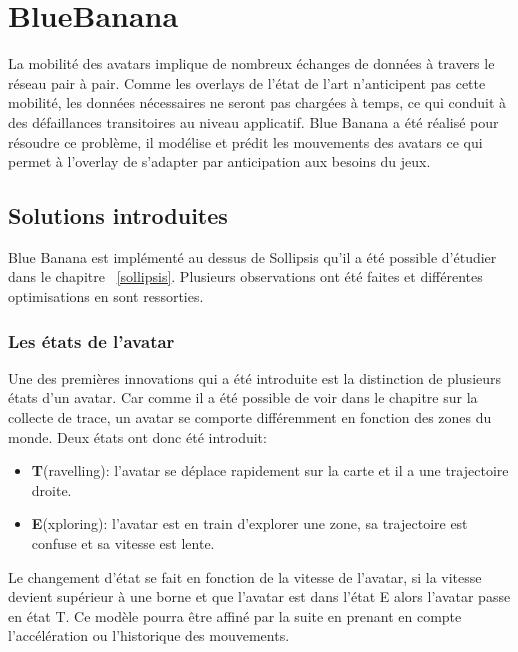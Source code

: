 \section{BlueBanana}
	\label{BlueBanana}
	La mobilité des avatars implique de nombreux échanges de données à travers le réseau pair à pair. Comme les overlays de l'état de l'art n'anticipent pas cette mobilité, les données nécessaires ne seront pas chargées à temps, ce qui conduit à des défaillances transitoires au niveau applicatif. Blue Banana a été réalisé pour résoudre ce problème, il modélise et prédit les mouvements des avatars ce qui permet à l'overlay de s'adapter par anticipation aux besoins du jeux.
	\subsection{Solutions introduites}
	Blue Banana est implémenté au dessus de Sollipsis qu'il a été possible d'étudier dans le chapitre ~\ref{sollipsis}. Plusieurs observations ont été faites et différentes optimisations en sont ressorties.
	\subsubsection{Les états de l'avatar}
	Une des premières innovations qui a été introduite est la distinction de plusieurs états d'un avatar. Car comme il a été possible de voir dans le chapitre sur la collecte de trace, un avatar se comporte différemment en fonction des zones du monde. Deux états ont donc été introduit:
	\begin{itemize}
	\renewcommand{\labelitemi}{$\bullet$}
		\item \textbf{T}(ravelling): l'avatar se déplace rapidement sur la carte et il a une trajectoire droite.  
		\item \textbf{E}(xploring): l'avatar est en train d'explorer une zone, sa trajectoire est confuse et sa vitesse est lente.
	\end{itemize} 
	Le changement d'état se fait en fonction de la vitesse de l'avatar, si la vitesse devient supérieur à une borne et que l'avatar est dans l'état E alors l'avatar passe en état T. Ce modèle pourra être affiné par la suite en prenant en compte l'accélération ou l'historique des mouvements. \\
